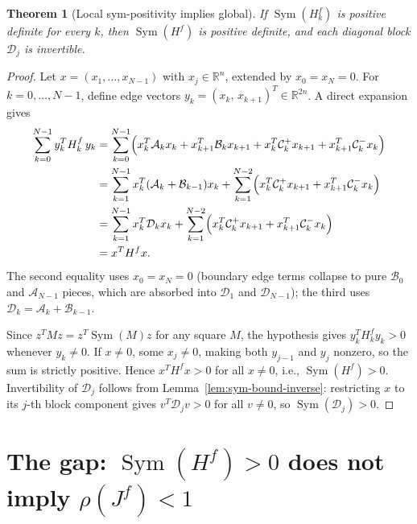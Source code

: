 \documentclass{article}
\newtheorem{theorem}{Theorem}
\newcommand{\RR}{\mathbb{R}}
\newcommand{\Sym}{\operatorname{Sym}}
\begin{document}
\begin{theorem}[Local sym-positivity implies global]\label{thm:forced-local-implies-global}
    If $\Sym(H_k^f)$ is positive definite for every $k$, then $\Sym(H^f)$ is positive definite,
    and each diagonal block $\mathcal{D}_j$ is invertible.
\end{theorem}
\begin{proof}
    Let $x = (x_1, \ldots, x_{N-1})$ with $x_j \in \RR^n$, extended by $x_0 = x_N = 0$.
    For $k = 0, \ldots, N-1$, define edge vectors $y_k = (x_k,\, x_{k+1})^T \in \RR^{2n}$.
    A direct expansion gives
    \begin{align*}
        \sum_{k=0}^{N-1} y_k^T H_k^f\, y_k
        &= \sum_{k=0}^{N-1} \Bigl(
            x_k^T \mathcal{A}_k x_k
            + x_{k+1}^T \mathcal{B}_k x_{k+1}
            + x_k^T \mathcal{C}^+_k x_{k+1}
            + x_{k+1}^T \mathcal{C}^-_k x_k
           \Bigr) \\
        &= \sum_{k=1}^{N-1} x_k^T (\mathcal{A}_k + \mathcal{B}_{k-1}) x_k
           + \sum_{k=1}^{N-2} \Bigl( x_k^T \mathcal{C}^+_k x_{k+1} + x_{k+1}^T \mathcal{C}^-_k x_k \Bigr) \\
        &= \sum_{k=1}^{N-1} x_k^T \mathcal{D}_k x_k
           + \sum_{k=1}^{N-2} \Bigl( x_k^T \mathcal{C}^+_k x_{k+1} + x_{k+1}^T \mathcal{C}^-_k x_k \Bigr) \\
        &= x^T H^f x.
    \end{align*}
    The second equality uses $x_0 = x_N = 0$ (boundary edge terms collapse to
    pure $\mathcal{B}_0$ and $\mathcal{A}_{N-1}$ pieces, which are absorbed into
    $\mathcal{D}_1$ and $\mathcal{D}_{N-1}$); the third uses
    $\mathcal{D}_k = \mathcal{A}_k + \mathcal{B}_{k-1}$.

    Since $z^T M z = z^T \Sym(M) z$ for any square $M$, the hypothesis
    gives $y_k^T H_k^f y_k > 0$ whenever $y_k \neq 0$. If $x \neq 0$, some
    $x_j \neq 0$, making both $y_{j-1}$ and $y_j$ nonzero, so the sum is strictly
    positive. Hence $x^T H^f x > 0$ for all $x \neq 0$, i.e., $\Sym(H^f) > 0$.
    Invertibility of $\mathcal{D}_j$ follows from Lemma~\ref{lem:sym-bound-inverse}:
    restricting $x$ to its $j$-th block component gives $v^T \mathcal{D}_j v > 0$
    for all $v \neq 0$, so $\Sym(\mathcal{D}_j) > 0$.
\end{proof}

\section{The gap: $\Sym(H^f) > 0$ does not imply $\rho(J^f) < 1$}\label{sec:gap}
\end{document}
